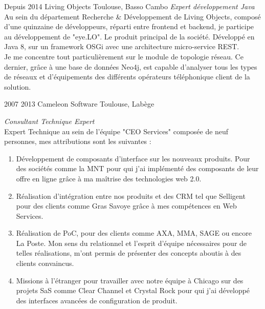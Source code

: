 \documentclass{friggeri-cv} 	%
\begin{document}
\begin{entrylist}
\entry
{Depuis 2014}
{Living Objects}
{Toulouse, Basso Cambo}
{\vspace{0.2cm}\emph{Expert développement Java} \\
Au sein du département Recherche \& Développement de Living Objects, composé d'une quinzaine de développeurs,
réparti entre frontend et backend, je participe au développement de "eye.LO". Le produit principal de la société. Développé
en Java 8, sur un framework OSGi avec une architecture micro-service REST.\\

Je me concentre tout particulièrement sur le module de topologie réseau. Ce dernier, grâce à une base de données Neo4j,
est capable d'analyser tous les types de réseaux et d'équipements des différents opérateurs téléphonique client de la solution.
\\}

\entry
{2007  2013}
{Cameleon Software}
{Toulouse, Labège}
{\vspace{0.2cm}\emph{Consultant Technique Expert} \\
Expert Technique au sein de l'équipe "CEO Services" composée de neuf personnes, mes attributions sont les suivantes :

\begin{enumerate}
\item Développement de composants d’interface sur les nouveaux produits. Pour des sociétés comme la MNT pour qui j’ai implémenté des composants de leur offre en ligne grâce à ma maîtrise des technologies web 2.0.
\item Réalisation d’intégration entre nos produits et des CRM tel que Selligent pour des clients comme Gras Savoye grâce à mes compétences en Web Services.
\item Réalisation de PoC, pour des clients comme AXA, MMA, SAGE ou encore La Poste. Mon sens du relationnel et l'esprit d'équipe nécessaires pour de telles réalisations, m'ont permis de présenter des concepts aboutis à des clients convaincus.
\item Missions à l’étranger pour travailler avec notre équipe à Chicago sur des projets SaS comme Clear Channel et Crystal Rock pour qui j'ai développé des interfaces avancées de configuration de produit.
\end{enumerate}
\
}


\end{entrylist}
\end{document}
